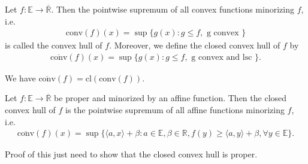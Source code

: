 \documentclass{tufte-handout}
\begin{document}
\begin{Definition}
    Let \( f:\mathbb{E}\to \overline{\mathbb{R}} \). Then the pointwise supremum of all convex 
    functions minorizing \( f \), i.e.
    \begin{align}
    \text{conv}(f)(x) = \sup\{g(x): g \leq f, \text{ g convex }\}
    \end{align}
    is called the convex hull of \( f \). Moreover, we define the closed convex hull of \( f \) by
    \begin{align}
    \overline{\text{conv}}(f)(x) = \sup\{g(x): g \leq f, \text{ g convex and lsc }\}.
    \end{align}
\end{Definition}
We have \( \overline{\text{conv}}(f) = \text{cl}(\text{conv}(f)) \).

\begin{Corollary}
    Let \( f:\mathbb{E}\to \overline{\mathbb{R}} \) be proper and minorized by an affine function. 
    Then the closed convex hull of \( f \) is the pointwise supremum of all affine functions minorizing \( f \), i.e.
    \begin{align}
        \overline{\text{conv}}(f)(x) = \sup\{\langle a, x \rangle + \beta : a \in \mathbb{E}, \beta \in \mathbb{R}, f(y) \geq \langle a, y \rangle + \beta, \forall y \in \mathbb{E} \}.
    \end{align}
\end{Corollary}
Proof of this just need to show that the closed convex hull is proper.

\hfill\qedsymbol
\end{document}
